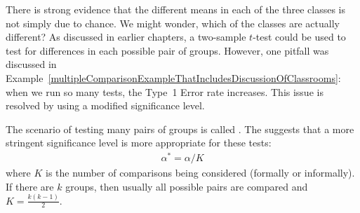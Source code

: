 There is strong evidence that the different means in each of the three classes is not simply due to chance. We might wonder, which of the classes are actually different? As discussed in earlier chapters, a two-sample $t$-test could be used to test for differences in each possible pair of groups. However, one pitfall was discussed in Example~\vref{multipleComparisonExampleThatIncludesDiscussionOfClassrooms}: when we run so many tests, the Type~1 Error rate increases. This issue is resolved by using a modified significance level. 

\begin{termBox}{
The scenario of testing many pairs of groups is called . The  suggests that a more stringent significance level is more appropriate for these tests:
\begin{align*}
\alpha^* = \alpha / K
\end{align*}
where $K$ is the number of comparisons being considered (formally or informally). If there are $k$ groups, then usually all possible pairs are compared and $K=\frac{k(k-1)}{2}$.}
\end{termBox}

